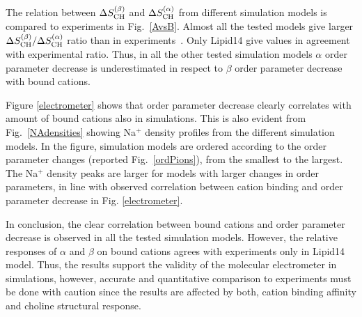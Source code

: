 \documentclass[pre,aps,floatfix,authordate1-4,twocolumn]{revtex4-1}
\begin{document}
The relation between $\Delta S_{\rm{CH}}^{(\beta)}$ and $\Delta S_{\rm{CH}}^{(\alpha)}$ from different simulation models
is compared to experiments in Fig.~\ref{AvsB}. Almost all the tested models give larger $\Delta S_{\rm{CH}}^{(\beta)}/\Delta S_{\rm{CH}}^{(\alpha)}$ ratio
than in experiments~\cite{akutsu81}. Only Lipid14 give values in agreement with experimental ratio.
Thus, in all the other tested simulation models $\alpha$ order parameter decrease is underestimated in
respect to $\beta$ order parameter decrease with bound cations.

Figure \ref{electrometer} shows that order parameter decrease clearly correlates with
amount of bound cations also in simulations. This is also evident from Fig.~\ref{NAdensities}
showing Na$^+$ density profiles from the different simulation models. 
In the figure, simulation models are ordered according to the order parameter changes 
(reported Fig.~\ref{ordPions}), from the smallest to the largest.
The Na$^+$ density peaks are larger for models with larger changes in order parameters,
in line with observed correlation between cation binding and order parameter decrease in
Fig. \ref{electrometer}.

In conclusion, the clear correlation between bound cations and order parameter decrease 
is observed in all the tested simulation models. However, the relative responses of $\alpha$ and $\beta$
on bound cations agrees with experiments only in Lipid14 model. Thus, the results
support the validity of the molecular electrometer in simulations, however, accurate and
quantitative comparison to experiments must be done with caution since the results are
affected by both, cation binding affinity and choline structural response.
\end{document}

